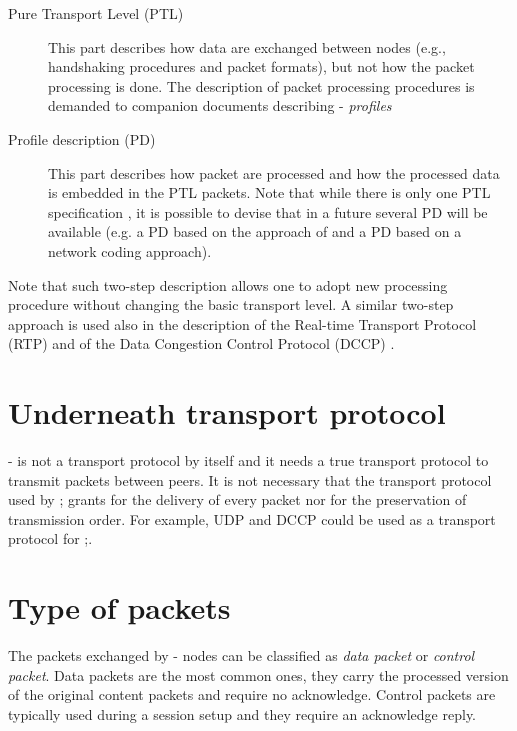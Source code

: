 \documentclass{rfc}
\begin{document}
\begin{description}
\item[Pure Transport Level (PTL)] This part describes how data are exchanged
  between nodes (e.g., handshaking procedures and packet formats), but
  not how the packet processing is done.  The description of packet
  processing procedures is demanded to companion documents describing
  \ppetp- \emph{profiles}
\item[Profile description (PD)] This part describes how packet are
  processed and how the processed data is embedded in the PTL
  packets. Note that while there is only one PTL specification , it is
  possible to devise that in a future several PD will be available
  (e.g. a PD based on the approach of \cite{bernardini08:dcc08} and a
  PD based on a network coding approach).
\end{description}
%
Note that such two-step description allows one to adopt new processing
procedure without changing the basic transport level.  A similar
two-step approach is used also in the description of the Real-time
Transport Protocol (RTP) \cite{rfc3550} and of the Data Congestion
Control Protocol (DCCP) \cite{rfc4336}.

\section{Underneath transport protocol}
\label{subsub:0.0.0;driver}

\ppetp- is not a transport protocol by itself and it needs a true
transport protocol to transmit packets between peers.  It is not
necessary that the transport protocol used by \ppmtp; grants for the
delivery of every packet nor for the preservation of transmission
order.  For example, UDP and DCCP could be used as a transport
protocol for \ppmtp;.

\section{Type of packets}
\label{sub:0.2;driver}


The packets exchanged by \ppetp- nodes can be classified as \emph{data
packet} or \emph{control packet}.  Data packets are the most common
ones, they carry the processed version of the original content packets
and require no acknowledge.  Control packets are typically used during
a session setup and they require an acknowledge reply.
\end{document}

